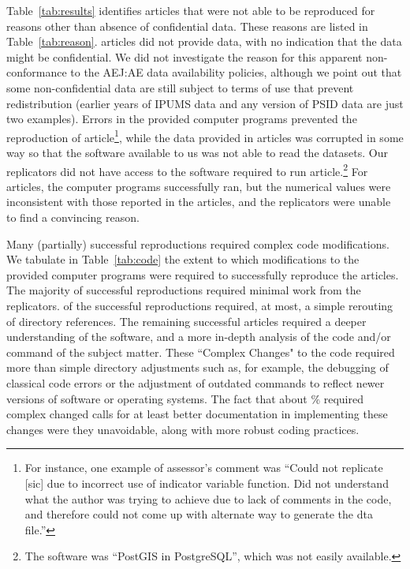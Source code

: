 Table~\ref{tab:results} identifies   articles that were not able to be reproduced for  reasons other than absence of confidential data. These reasons are listed in Table~\ref{tab:reason}.  articles did not provide data, with no indication that the data might be confidential. We did not investigate  the reason for this apparent  non-conformance to the \ac{AEJ:AE} data availability policies, although we point out that some non-confidential data are still subject to terms of use that prevent redistribution (earlier years of IPUMS data and any version of PSID data are just two examples). Errors in the provided computer programs prevented the reproduction of article\footnote{For instance, one example of assessor's  comment was ``Could not replicate [sic] due to incorrect use of indicator variable function. Did not understand what the author was trying to achieve due to lack of comments in the code, and therefore could not come up with alternate way to generate the dta file.''}, while the data provided in  articles was corrupted in some way so that the software available to us was not able to read the datasets.  Our replicators did not have access to the software required to run  article.\footnote{The software was ``PostGIS in PostgreSQL'', which was not easily available.} For  articles, the computer programs successfully ran, but the numerical values were inconsistent with those reported in the articles, and the replicators were unable to find a convincing reason.
\FloatBarrier




Many (partially) successful reproductions required complex code modifications. We tabulate in Table~\ref{tab:code} the extent to which modifications to the provided computer programs were required to successfully reproduce the articles. The majority of successful reproductions required minimal work from the replicators.  of the  successful reproductions required, at most, a simple rerouting of directory references. The remaining  successful articles required a deeper understanding of the software, and a more in-depth analysis of the code and/or command of the subject matter. These ``Complex Changes" to the code required more than simple directory adjustments such as, for example, the debugging of classical code errors or the adjustment of outdated commands to reflect newer versions of software or operating systems. The fact that about $\%$ required complex changed calls for at least better documentation in implementing these changes were they unavoidable, along with more robust coding practices.


